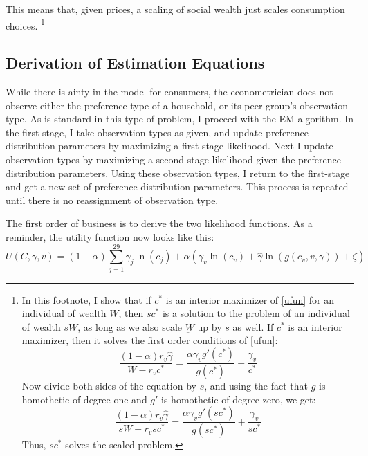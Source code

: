 \documentclass{article}
\begin{document}
This means that, given prices, a scaling of social wealth just scales consumption choices.
\footnote{
In this footnote, I show that if $c^*$ is an interior maximizer of \eqref{ufun} for an individual of wealth $W$, then $s c^*$ is a solution to the  problem of an individual of wealth $s W$, as long as we also scale $\underbar{W}$ up by $s$ as well.
If $c^*$ is an interior maximizer, then it solves the first order conditions of \eqref{ufun}:
\[
\frac{(1-\alpha)r_v \hat{\gamma}}{W-r_v c^*} = \frac{\alpha \gamma_v g'(c^*)}{g(c^*)} + \frac{\gamma_v}{c^*}
\]
Now divide both sides of the equation by $s$, and using the fact that $g$ is homothetic of degree one and $g'$ is homothetic of degree zero, we get:
\[
\frac{(1-\alpha)r_v \hat{\gamma}}{s W-r_v s c^*} = \frac{\alpha \gamma_v g'(s c^*)}{g(s c^*)} + \frac{\gamma_v}{s c^*}
\]
Thus, $s c^*$ solves the scaled problem.
}
\subsection{Derivation of Estimation Equations}
While there is ainty in the model for consumers, the econometrician does not observe either the preference type of a household, or its peer group's observation type.
As is standard in this type of problem, I proceed with the EM algorithm.
In the first stage, I take observation types as given, and update preference distribution parameters by maximizing a first-stage likelihood.
Next I update observation types by maximizing a second-stage likelihood given the preference distribution parameters.
Using these observation types, I return to the first-stage and get a new set of preference distribution parameters.
This process is repeated until there is no reassignment of observation type.

The first order of business is to derive the two likelihood functions.
As a reminder, the utility function now looks like this:
\begin{equation}
	\label{totuti}
U(C,\gamma,v) = (1-\alpha) \sum_{j=1}^{29}\gamma_j \ln(c_j )  + \alpha \left(\gamma_v \ln(c_v)+ \hat{\gamma}\ln(g(c_v,v,\gamma))  + \zeta \right)
\end{equation}
\end{document}
